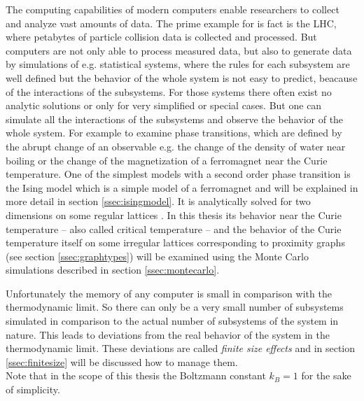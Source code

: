 The computing capabilities of modern computers enable researchers to
collect and analyze vast amounts of data. The prime example for is fact
is the LHC, where petabytes of particle collision data is collected and
processed. But computers are not only able to process measured data, but
also to generate data by simulations of e.g. statistical systems, where
the rules for each subsystem are well defined but the behavior of the
whole system is not easy to predict, beacause of the interactions of the
subsystems. For those systems there often exist no analytic solutions
or only for very simplified or special cases. But one can simulate all
the interactions of the subsystems and observe the behavior of the whole
system.
For example to examine phase transitions, which are defined by the abrupt
change of an observable e.g. the change of the density of water near
boiling or the change of the magnetization of a ferromagnet near the
Curie temperature. One of the simplest models with a second order
phase transition is the Ising model \cite{Ising1925} which is a simple
model of a ferromagnet and will be explained in more detail in section
\ref{ssec:isingmodel}. It is analytically solved for two dimensions on
some regular lattices \cite{Onsager1944} \cite{Wannier1945}.
In this thesis its behavior near the Curie temperature -- also called
critical temperature -- and the behavior of the Curie temperature itself
on some irregular lattices corresponding to proximity graphs
(see section \ref{ssec:graphtypes}) will be examined using the Monte
Carlo simulations described in section \ref{ssec:montecarlo}.

Unfortunately the memory of any computer is small in comparison with the
thermodynamic limit. So there can only be a very small number of
subsystems simulated in comparison to the actual number of subsystems
of the system in nature. This leads to deviations from the real behavior
of the system in the thermodynamic limit. These deviations are called
\emph{finite size effects} and in section \ref{ssec:finitesize} will be
discussed how to manage them.\\

Note that in the scope of this thesis the Boltzmann constant \(k_{B}=1\)
for the sake of simplicity.
